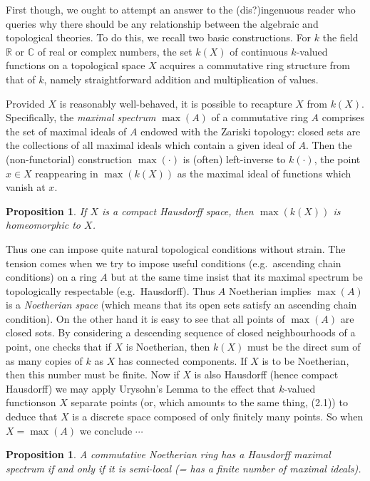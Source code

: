 \documentclass[openany,leqno]{book}  %
\newcommand{\R}{\mathbb{R}}
\newtheorem{prop}[theorem]{Proposition}
\begin{document}
First though, we ought to attempt an answer to the (dis?)ingenuous reader who queries why there should be any relationship between the algebraic and topological theories. To do this, we recall two basic constructions. For $k$ the field $\R$ or $\mathbb{C}$ of real or complex numbers, the set $k(X)$ of continuous $k$-valued functions on a topological space $X$ acquires a commutative ring structure from that of $k$, namely straightforward addition and multiplication of values.

Provided $X$ is reasonably well-behaved, it is possible to recapture $X$ from $k(X)$. Specifically, the {\em maximal spectrum} $\max(A)$  of a commutative ring $A$ comprises the set of maximal ideals of $A$ endowed with the Zariski topology: closed sets are the collections of all maximal ideals which contain a given ideal of $A$. Then the (non-functorial) construction $\max(\cdot)$ is (often) left-inverse to $k(\cdot)$, the point $x\in X$ reappearing in $\max(k(X))$ as the maximal ideal of functions which
vanish at $x$.
\begin{prop}
If $X$ is a compact Hausdorff space, then $\max(k(X))$ is homeomorphic to $X$.
\end{prop}

Thus one can impose quite natural topological conditions without strain. The tension comes when we try to impose useful conditions (e.g.\  ascending chain conditions) on a ring $A$ but at the same time insist that its maximal spectrum be topologically respectable (e.g.\ Hausdorff). Thus $A$ Noetherian implies $\max(A)$ is a {\em Noetherian space} (which means that its open sets satisfy an ascending chain condition). On the other hand it is easy to see that all points of $\max(A)$ are closed sots. By considering a descending sequence of closed neighbourhoods of a point, one checks that if $X$ is Noetherian, then $k(X)$ must be the direct sum of as many copies of $k$ as $X$ has connected components. If $X$ is to be Noetherian, then this number must be finite. Now if $X$ is also Hausdorff (hence compact Hausdorff) we may apply Urysohn's Lemma to the effect that $k$-valued functionson $X$ separate points (or, which amounts to the same thing, (2.1)) to deduce that $X$ is a discrete space composed of only finitely many points. So when $X=\max(A)$ we conclude $\cdots$
\begin{prop}
A commutative Noetherian ring has a Hausdorff maximal spectrum if and only if it is semi-local (= has a finite number of maximal ideals).
\end{prop}
\end{document}
